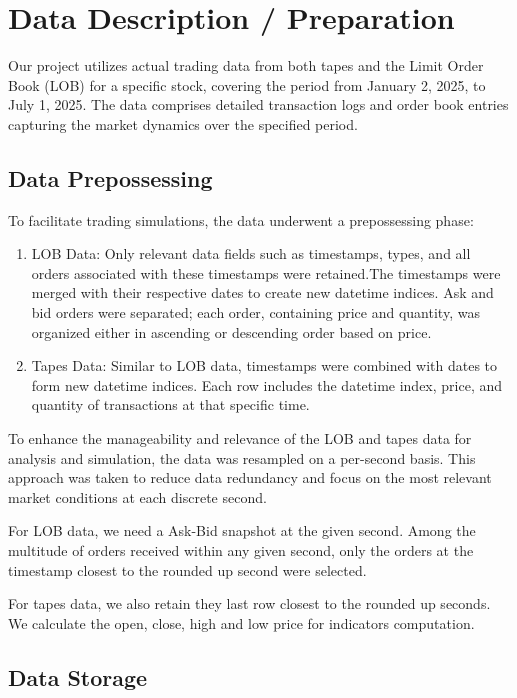 \documentclass[conference]{IEEEtran}
\begin{document}
\section{Data Description / Preparation}

Our project utilizes actual trading data from both tapes and the Limit Order Book (LOB) for a specific stock, covering the period from January 2, 2025, to July 1, 2025. The data comprises detailed transaction logs and order book entries capturing the market dynamics over the specified period.

\subsection{Data Prepossessing}

To facilitate trading simulations, the data underwent a prepossessing phase:
\begin{enumerate}    
  \item LOB Data: Only relevant data fields such as timestamps, types, and all orders associated with these timestamps were retained.The timestamps were merged with their respective dates to create new datetime indices. Ask and bid orders were separated; each order, containing price and quantity, was organized either in ascending or descending order based on price. 
  \item Tapes Data: Similar to LOB data, timestamps were combined with dates to form new datetime indices. Each row includes the datetime index, price, and quantity of transactions at that specific time. 
  
\end{enumerate}


To enhance the manageability and relevance of the LOB and tapes data for analysis and simulation, the data was resampled on a per-second basis. This approach was taken to reduce data redundancy and focus on the most relevant market conditions at each discrete second. 

For LOB data, we need a Ask-Bid snapshot at the given second. Among the multitude of orders received within any given second, only the orders at the timestamp closest to the rounded up second were selected. 

For tapes data, we also retain they last row closest to the rounded up seconds. We calculate the open, close, high and low price for indicators computation.



\subsection{Data Storage}
\end{document}
